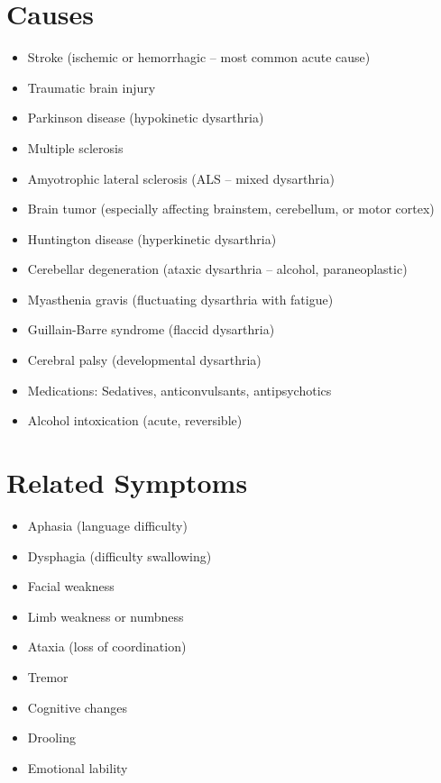 \section*{Causes}
\begin{itemize}
  \item Stroke (ischemic or hemorrhagic -- most common acute cause)
  \item Traumatic brain injury
  \item Parkinson disease (hypokinetic dysarthria)
  \item Multiple sclerosis
  \item Amyotrophic lateral sclerosis (ALS -- mixed dysarthria)
  \item Brain tumor (especially affecting brainstem, cerebellum, or motor cortex)
  \item Huntington disease (hyperkinetic dysarthria)
  \item Cerebellar degeneration (ataxic dysarthria -- alcohol, paraneoplastic)
  \item Myasthenia gravis (fluctuating dysarthria with fatigue)
  \item Guillain-Barre syndrome (flaccid dysarthria)
  \item Cerebral palsy (developmental dysarthria)
  \item Medications: Sedatives, anticonvulsants, antipsychotics
  \item Alcohol intoxication (acute, reversible)
\end{itemize}

\section*{Related Symptoms}
\begin{itemize}
  \item Aphasia (language difficulty)
  \item Dysphagia (difficulty swallowing)
  \item Facial weakness
  \item Limb weakness or numbness
  \item Ataxia (loss of coordination)
  \item Tremor
  \item Cognitive changes
  \item Drooling
  \item Emotional lability
\end{itemize}

